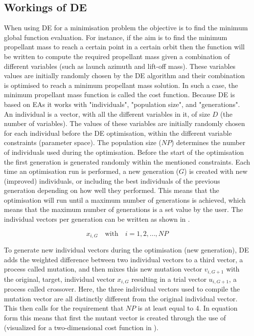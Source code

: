 \subsection{Workings of \ac{DE}}
\label{subsec:workde}
When using \ac{DE} for a minimisation problem the objective is to find the minimum global function evaluation. For instance, if the aim is to find the minimum propellant mass to reach a certain point in a certain orbit then the function will be written to compute the required propellant mass given a combination of different variables (such as launch azimuth and lift-off mass). These variables values are initially randomly chosen by the \ac{DE} algorithm and their combination is optimised to reach a minimum propellant mass solution. In such a case, the minimum propellant mass function is called the cost function. Because \ac{DE} is based on \ac{EA}s it works with "individuals", "population size", and "generations". An individual is a vector, with all the different variables in it, of size $D$ (the number of variables). The values of these variables are initially randomly chosen for each individual before the \ac{DE} optimisation, within the different variable constraints (parameter space). The population size ($NP$) determines the number of individuals used during the optimisation. Before the start of the optimisation the first generation is generated randomly within the mentioned constraints. Each time an optimisation run is performed, a new generation ($G$) is created with new (improved) individuals, or including the best individuals of the previous generation depending on how well they performed. This means that the optimisation will run until a maximum number of generations is achieved, which means that the maximum number of generations is a set value by the user. The individual vectors per generation can be written as shown in  \cite{storn1997differential}.



\begin{equation} \label{eq:individual vector}
x_{i,G} \quad \text{with} \quad i = 1,2,\dotsc,NP
\end{equation} 


To generate new individual vectors during the optimisation (new generation), \ac{DE} adds the weighted difference between two individual vectors to a third vector, a process called mutation, and then mixes this new mutation vector $v_{i,G+1}$ with the original, target, individual vector $x_{i,G}$ resulting in a trial vector $u_{i,G+1}$, a process called crossover. Here, the three individual vectors used to compile the mutation vector are all distinctly different from the original individual vector. This then calls for the requirement that $NP$ is at least equal to 4. 
In equation form this means that first the mutant vector is created through the use of  (visualized for a two-dimensional cost function in ). 

